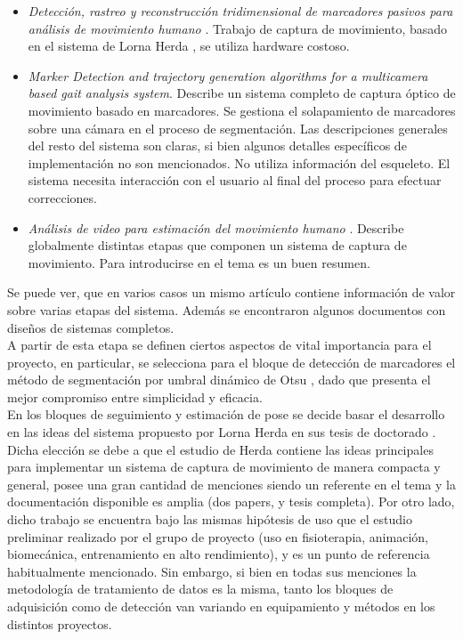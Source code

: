 \begin{itemize}
\begin{itemize}
		\item \emph{Detección, rastreo y reconstrucción tridimensional de marcadores pasivos para análisis de movimiento humano} \cite{colombianos}.	Trabajo de captura de movimiento, basado en el sistema de Lorna Herda \cite{herda}, se utiliza hardware costoso.
		\item \emph{Marker Detection and trajectory generation algorithms for a multicamera based gait analysis system}\cite{shafiq2001marker}.
		Describe un sistema completo de captura óptico de movimiento basado en marcadores.
		Se gestiona el solapamiento de marcadores sobre una cámara en el proceso de segmentación. Las descripciones generales del resto del sistema son claras, si bien algunos detalles específicos de implementación no son mencionados.
		No utiliza información del esqueleto. El sistema necesita interacción con el usuario al final del proceso para efectuar correcciones. 
		\item \emph{Análisis de video para estimación del movimiento humano} \cite{martinez2009analisis}. Describe globalmente distintas etapas que componen un sistema de captura de movimiento. Para introducirse en el tema es un buen resumen.
	\end{itemize}
\end{itemize}

Se puede ver, que en varios casos un mismo artículo contiene información de valor sobre varias etapas del sistema. Además se encontraron algunos documentos con diseños de sistemas completos.
\\ 

A partir de esta etapa se definen ciertos aspectos de vital importancia para el proyecto, en particular, se selecciona para el bloque de detección de marcadores el método de segmentación por umbral dinámico de Otsu \cite{otsu}, dado que presenta el mejor compromiso entre simplicidad y eficacia.
\\ 

En los bloques de seguimiento y estimación de pose se decide basar el desarrollo en las ideas del sistema propuesto por Lorna Herda en sus tesis de doctorado \cite{herda}. Dicha elección se debe a que el estudio de Herda contiene las ideas principales para implementar un sistema de captura de movimiento de manera compacta y general, posee una gran cantidad de menciones siendo un referente en el tema y la documentación disponible es amplia (dos papers, y tesis completa). Por otro lado, dicho trabajo se encuentra bajo las mismas hipótesis de uso que el estudio preliminar realizado por el grupo de proyecto (uso en fisioterapia, animación, biomecánica, entrenamiento en alto rendimiento), y es un punto de referencia habitualmente mencionado. Sin embargo, si bien en todas sus menciones la metodología de tratamiento de datos es la misma, tanto los bloques de adquisición como de detección van variando en equipamiento y métodos en los distintos proyectos.